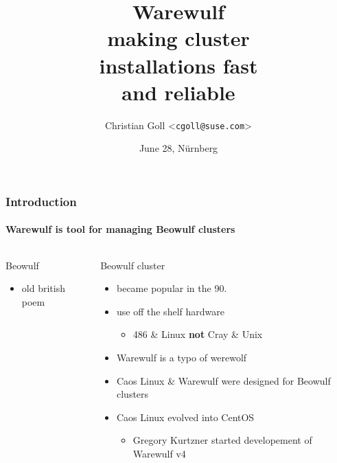 \documentclass[aspectratio=169]{beamer}
\title{Warewulf\\
making cluster\\
installations fast \\
and reliable}
\date{June 28, Nürnberg}
\author{Christian Goll <\texttt{cgoll@suse.com}>}
\begin{document}
\begin{frame}
\titlepage
\end{frame}
\begin{frame}[fragile]
\frametitle{Introduction}
\framesubtitle{Warewulf is tool for managing Beowulf clusters}
\begin{columns}
\begin{block}{Beowulf}
  \begin{itemize}
    \item old british poem
  \end{itemize}
\end{block}
\begin{block}{Beowulf cluster}
  \begin{itemize}
    \item became popular in the 90.
    \item use off the shelf hardware
    \begin{itemize}
      \item 486 \& Linux \textbf{not} Cray \& Unix
    \end{itemize}
    \item Warewulf is a typo of werewolf
    \item Caos Linux \& Warewulf were designed for Beowulf clusters
    \item Caos Linux evolved into CentOS
    \begin{itemize}
      \item Gregory Kurtzner started developement of Warewulf v4
    \end{itemize}
  \end{itemize}
\end{block}

\end{columns}
\end{frame}
\end{document}
